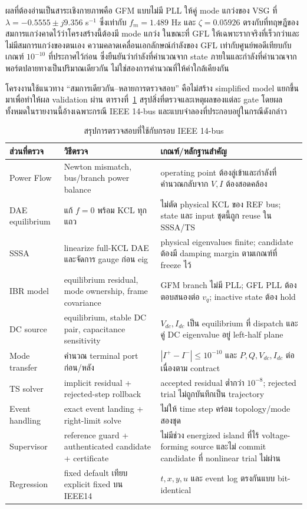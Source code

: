 \documentclass[12pt,a4paper]{article}
\newcommand{\templatesubheading}[1]{%
  \vspace{0.35em}\noindent{\color{academicblue}\rule{0.055\textwidth}{1.4pt}\hspace{0.45em}\fontsize{20}{22}\selectfont\bfseries #1}\par\vspace{0.12em}}
\begin{document}
ผลที่ต้องอ่านเป็นสาระเชิงกายภาพคือ GFM แบบไม่มี PLL ให้คู่ mode แกว่งของ VSG ที่ $\lambda=-0.5555\pm j9.356$ s$^{-1}$ ซึ่งเท่ากับ $f_m=1.489$ Hz และ $\zeta=0.05926$ ตรงกับที่ทฤษฎีของสมการแกว่งคาดไว้ว่าโครงสร้างนี้ต้องมี mode แกว่ง ในขณะที่ GFL ให้เฉพาะรากจริงที่เร็วกว่าและไม่มีสมการแกว่งของตนเอง ความคลาดเคลื่อนเอกลักษณ์กำลังของ GFL เท่ากับศูนย์พอดีเทียบกับเกณฑ์ $10^{-10}$ ที่ประกาศไว้ก่อน ซึ่งยืนยันว่ากำลังที่คำนวณจาก state ภายในและกำลังที่คำนวณจากพอร์ตปลายทางเป็นปริมาณเดียวกัน ไม่ใช่สองการคำนวณที่ให้ค่าใกล้เคียงกัน

\templatesubheading{14. วิธีตรวจสอบและหลักฐานที่ใช้ยืนยันแบบจำลอง}
โครงงานใช้แนวทาง ``สมการเดียวกัน--หลายการตรวจสอบ'' คือไม่สร้าง simplified model แยกขึ้นมาเพื่อทำให้ผล validation ผ่าน ตารางที่~\ref{tab:validation} สรุปสิ่งที่ตรวจและเหตุผลของแต่ละ gate โดยผลทั้งหมดในรายงานนี้อ้างเฉพาะกรณี IEEE 14-bus และแบบจำลองที่ประกอบอยู่ในกรณีดังกล่าว
\begin{table}[H]
\centering
\caption{สรุปการตรวจสอบที่ใช้กับกรอบ IEEE 14-bus}
\label{tab:validation}
\begin{tabularx}{0.98\textwidth}{@{}p{} p{} X@{}}
\toprule
ส่วนที่ตรวจ & วิธีตรวจ & เกณฑ์/หลักฐานสำคัญ \\
\midrule
Power Flow & Newton mismatch, bus/branch power balance & operating point ต้องลู่เข้าและกำลังที่คำนวณกลับจาก $V,I$ ต้องสอดคล้อง \\
DAE equilibrium & แก้ $f=0$ พร้อม KCL ทุกแถว & ไม่ตัด physical KCL ของ REF bus; state และ input ชุดนี้ถูก reuse ใน SSSA/TS \\
SSSA & linearize full-KCL DAE และจัดการ gauge ก่อน eig & physical eigenvalues finite; candidate ต้องมี damping margin ตามเกณฑ์ที่ freeze ไว้ \\
IBR model & equilibrium residual, mode ownership, frame covariance & GFM branch ไม่มี PLL; GFL PLL ต้องตอบสนองต่อ $v_q$; inactive state ต้อง hold \\
DC source & equilibrium, stable DC pair, capacitance sensitivity & $V_{dc},I_{dc}$ เป็น equilibrium ที่ dispatch และคู่ DC eigenvalue อยู่ left-half plane \\
Mode transfer & คำนวณ terminal port ก่อน/หลัง & $|I^+-I^-|\le10^{-10}$ และ $P,Q,V_{dc},I_{dc}$ ต่อเนื่องตาม contract \\
TS solver & implicit residual + rejected-step rollback & accepted residual ต่ำกว่า $10^{-8}$; rejected trial ไม่ถูกบันทึกเป็น trajectory \\
Event handling & exact event landing + right-limit solve & ไม่ให้ time step คร่อม topology/mode สองชุด \\
Supervisor & reference guard + authenticated candidate + certificate & ไม่มีช่วง energized island ที่ไร้ voltage-forming source และไม่ commit candidate ที่ nonlinear trial ไม่ผ่าน \\
Regression & fixed default เทียบ explicit fixed บน IEEE14 & $t,x,y,u$ และ event log ตรงกันแบบ bit-identical \\
\bottomrule
\end{tabularx}
\end{table}
\end{document}
